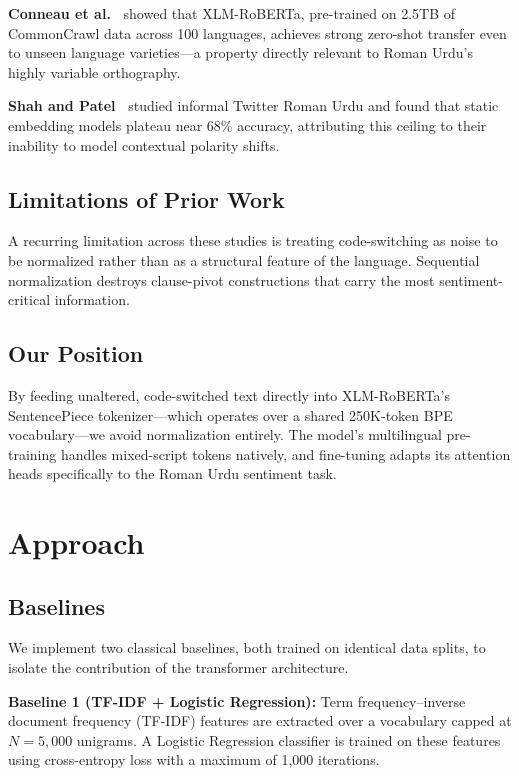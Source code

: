 \documentclass[conference]{IEEEtran}
\begin{document}
\textbf{Conneau et al.~\cite{ref4}} showed that XLM-RoBERTa, pre-trained on 2.5TB of CommonCrawl data across 100 languages, achieves strong zero-shot transfer even to unseen language varieties---a property directly relevant to Roman Urdu's highly variable orthography.

\textbf{Shah and Patel~\cite{ref5}} studied informal Twitter Roman Urdu and found that static embedding models plateau near 68\% accuracy, attributing this ceiling to their inability to model contextual polarity shifts.

\subsection{Limitations of Prior Work}
A recurring limitation across these studies is treating code-switching as noise to be normalized rather than as a structural feature of the language. Sequential normalization destroys clause-pivot constructions that carry the most sentiment-critical information.

\subsection{Our Position}
By feeding unaltered, code-switched text directly into XLM-RoBERTa's SentencePiece tokenizer---which operates over a shared 250K-token BPE vocabulary---we avoid normalization entirely. The model's multilingual pre-training handles mixed-script tokens natively, and fine-tuning adapts its attention heads specifically to the Roman Urdu sentiment task.

\section{Approach}

\subsection{Baselines}
We implement two classical baselines, both trained on identical data splits, to isolate the contribution of the transformer architecture.

\textbf{Baseline 1 (TF-IDF + Logistic Regression):}
Term frequency--inverse document frequency (TF-IDF) features are extracted over a vocabulary capped at $N = 5{,}000$ unigrams. A Logistic Regression classifier is trained on these features using cross-entropy loss with a maximum of 1,000 iterations.
\end{document}
